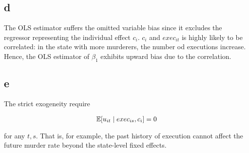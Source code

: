 \documentclass[11pt]{article}
\begin{document}
\subsection*{d}

The OLS estimator suffers the omitted variable bias since it excludes the regressor representing the individual effect $c_i$. $c_i$ and $exec_{it}$ is highly likely to be correlated: in the state with more murderers, the number od executions increase. Hence, the OLS estimator of $\beta_1$ exhibits upward bias due to the correlation.

\subsection*{e}

The strict exogeneity require

\begin{align*}
    \mathbb{E}[u_{it} \mid exec_{is}, c_i] = 0
\end{align*}

for any $t, s$. That is, for example, the past history of execution cannot affect the future murder rate beyond the state-level fixed effects.
\end{document}
